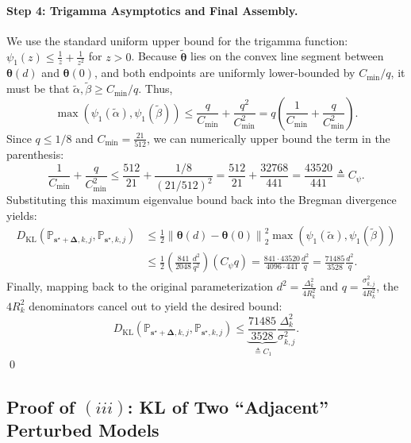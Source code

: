 \documentclass{article}
\def\vs{{\bm{s}}}
\def\sP{{\mathbb{P}}}
\newcommand{\KL}{D_{\mathrm{KL}}}
\theoremstyle{plain}
\theoremstyle{definition}
\theoremstyle{plain}
\newcommand{\bignorm}[1]{\left\lVert #1 \right\rVert}
\begin{document}
\paragraph{Step 4: Trigamma Asymptotics and Final Assembly.}
We use the standard uniform upper bound for the trigamma function: $\psi_1(z) \leq \frac{1}{z} + \frac{1}{z^2}$ for $z > 0$.
Because $\tilde{\bm\theta}$ lies on the convex line segment between $\bm\theta(d)$ and $\bm\theta(0)$, and both endpoints are uniformly lower-bounded by $C_{\min}/q$, it must be that $\tilde{\alpha}, \tilde{\beta} \geq C_{\min}/q$. Thus,
\begin{equation}
    \max(\psi_1(\tilde{\alpha}), \psi_1(\tilde{\beta})) \leq \frac{q}{C_{\min}} + \frac{q^2}{C_{\min}^2} = q \left( \frac{1}{C_{\min}} + \frac{q}{C_{\min}^2} \right).
\end{equation}
Since $q \leq 1/8$ and $C_{\min} = \frac{21}{512}$, we can numerically upper bound the term in the parenthesis:
\begin{equation}
    \frac{1}{C_{\min}} + \frac{q}{C_{\min}^2} \leq \frac{512}{21} + \frac{1/8}{(21/512)^2} = \frac{512}{21} + \frac{32768}{441} = \frac{43520}{441} \triangleq C_\psi.
\end{equation}
Substituting this maximum eigenvalue bound back into the Bregman divergence yields:
\begin{align}
    \KL(\sP_{\vs^\star+\bm\Delta,k,j}, \sP_{\vs^\star,k,j}) &\leq \frac{1}{2} \bignorm{\bm\theta(d) - \bm\theta(0)}_2^2 \max(\psi_1(\tilde{\alpha}), \psi_1(\tilde{\beta})) \\
    &\leq \frac{1}{2} \left( \frac{841}{2048} \frac{d^2}{q^2} \right) (C_\psi q) = \frac{841 \cdot 43520}{4096 \cdot 441} \frac{d^2}{q} = \frac{71485}{3528} \frac{d^2}{q}.
\end{align}
Finally, mapping back to the original parameterization $d^2 = \frac{\Delta_k^2}{4 R_k^2}$ and $q = \frac{\sigma_{k,j}^2}{4 R_k^2}$, the $4 R_k^2$ denominators cancel out to yield the desired bound:
\begin{equation}
    \KL(\sP_{\vs^\star+\bm\Delta,k,j}, \sP_{\vs^\star,k,j}) \leq \underbrace{\frac{71485}{3528}}_{\triangleq C_1} \frac{\Delta_k^2}{\sigma_{k,j}^2}.
\end{equation}
\qed


\subsection{\texorpdfstring{Proof of $(iii)$: KL of Two ``Adjacent'' Perturbed Models}{Proof of (iii): KL of Two ``Adjacent'' Perturbed Models}}
\end{document}
